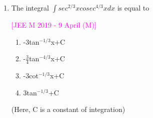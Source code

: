 \documentclass[journal,12pt,twocolumn]{IEEEtran}
\theoremstyle{remark}
\begin{document}
\begin{enumerate}[label=\textcolor{magenta}{\arabic*.}]
	\item The integral $\int sec^{2/3}xcosec^{4/3}x dx$ is equal to

		\hfill{\textcolor{magenta}{[JEE M 2019 - 9 April (M)]}}

		\begin{multicols}{2}
			\begin{enumerate}[label=(\alph*)]
				\item -3tan$^{-1/3}$x+C
				\item -$\frac{3}{4}$tan$^{-4/3}$x+C
				\item -3cot$^{-1/3}$x+C
				\item 3tan$^{-1/3}$+C
			\end{enumerate}
		\end{multicols}
		(Here, C is a constant of integration)
\end{enumerate}
\end{document}
